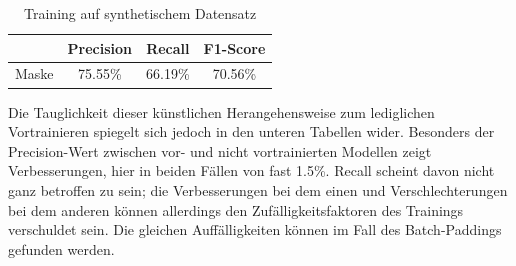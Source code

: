 \begin{table}[H]
    \centering
    \begin{minipage}{0.475\textwidth}
        \centering
        \begin{tabular}{|l|c|c|c|}
            \hline
            \rowcolor[HTML]{EFEFEF}
                  & Precision & Recall  & F1-Score \\ \hline
            Maske & 75.55\%   & 66.19\% & 70.56\%  \\ \hline
        \end{tabular}
        \caption{Training auf synthetischem Datensatz}
    \end{minipage}%
\end{table}

Die Tauglichkeit dieser künstlichen Herangehensweise zum lediglichen Vortrainieren spiegelt sich jedoch in den unteren Tabellen wider. Besonders der Precision-Wert zwischen vor- und nicht vortrainierten Modellen zeigt Verbesserungen, hier in beiden Fällen von fast 1.5\%. Recall scheint davon nicht ganz betroffen zu sein; die Verbesserungen bei dem einen und Verschlechterungen bei dem anderen können allerdings den Zufälligkeitsfaktoren des Trainings verschuldet sein. Die gleichen Auffälligkeiten können im Fall des Batch-Paddings gefunden werden.

